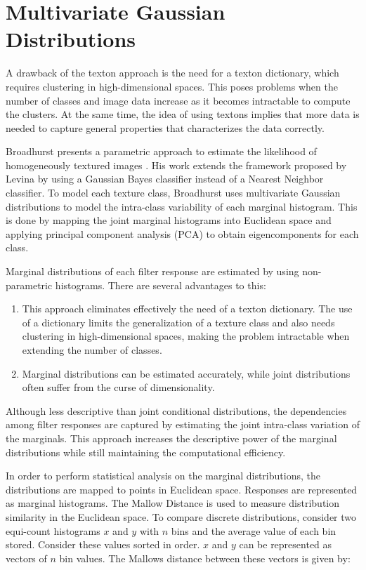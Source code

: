 \section{Multivariate Gaussian Distributions}\label{sec:MGD}
A drawback of the texton approach is the need for a texton dictionary, which requires clustering in high-dimensional spaces. This poses problems when the number of classes and image data increase as it becomes intractable to compute the clusters. At the same time, the idea of using textons implies that more data is needed to capture general properties that characterizes the data correctly.

Broadhurst presents a parametric approach to estimate the likelihood of homogeneously textured images \cite{Broadhurst}. His work extends the framework proposed by Levina \cite{Levina} by using a Gaussian Bayes classifier instead of a Nearest Neighbor classifier. To model each texture class, Broadhurst uses multivariate Gaussian distributions to model the intra-class variability of each marginal histogram. This is done by mapping the joint marginal histograms into Euclidean space and applying principal component analysis (PCA) to obtain eigencomponents for each class.

Marginal distributions of each filter response are estimated by using non-parametric histograms. There are several advantages to this:

\begin{enumerate}
	\item This approach eliminates effectively the need of a texton dictionary. The use of a dictionary limits the generalization of a texture class and also needs clustering in high-dimensional spaces, making the problem intractable when extending the number of classes.
	\item Marginal distributions can be estimated accurately, while joint distributions often suffer from the curse of dimensionality.
\end{enumerate}

\noindent Although less descriptive than joint conditional distributions, the dependencies among filter responses are captured by estimating the joint intra-class variation of the marginals. This approach increases the descriptive power of the marginal distributions while still maintaining the computational efficiency. 

In order to perform statistical analysis on the marginal distributions, the distributions are mapped to points in Euclidean space. Responses are represented as marginal histograms. The Mallow Distance is used to measure distribution similarity in the Euclidean space. To compare discrete distributions, consider two equi-count histograms $x$ and $y$ with $n$ bins and the average value of each bin stored. Consider these values sorted in order. $x$ and $y$ can be represented as vectors of $n$ bin values. The Mallows distance between these vectors is given by:


